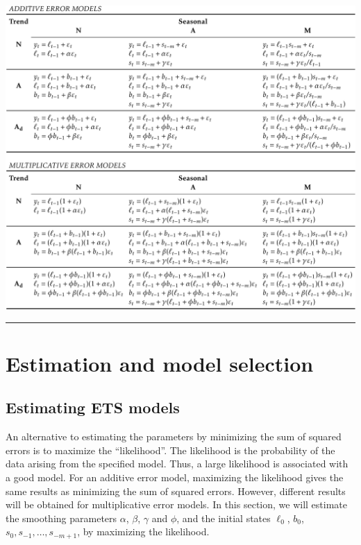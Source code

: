 \documentclass[]{book}
\begin{document}
\begin{center}\includegraphics[width=0.9\linewidth]{statespacemodels} \end{center}

\begin{center}\rule{0.5\linewidth}{\linethickness}\end{center}

\hypertarget{estimation-and-model-selection}{%
\section{Estimation and model selection}\label{estimation-and-model-selection}}

\hypertarget{estimating-ets-models}{%
\subsection*{Estimating ETS models}\label{estimating-ets-models}}

An alternative to estimating the parameters by minimizing the sum of squared errors is to maximize the ``likelihood''. The likelihood is the probability of the data arising from the specified model. Thus, a large likelihood is associated with a good model. For an additive error model, maximizing the likelihood gives the same results as minimizing the sum of squared errors. However, different results will be obtained for multiplicative error models. In this section, we will estimate the smoothing parameters \(\alpha\), \(\beta\), \(\gamma\) and \(\phi\), and the initial states \(\ell_0\), \(b_0\), \(s_0,s_{-1},\dots,s_{-m+1}\), by maximizing the likelihood.
\end{document}
